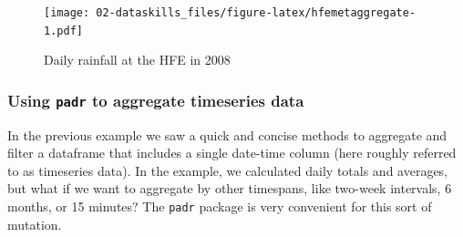 \documentclass[]{book}
\newenvironment{Shaded}{\begin{snugshade}}{\end{snugshade}}
\newcommand{\CommentTok}[1]{\textcolor[rgb]{0.56,0.35,0.01}{\textit{#1}}}
\newcommand{\DataTypeTok}[1]{\textcolor[rgb]{0.13,0.29,0.53}{#1}}
\newcommand{\KeywordTok}[1]{\textcolor[rgb]{0.13,0.29,0.53}{\textbf{#1}}}
\newcommand{\NormalTok}[1]{#1}
\newcommand{\OperatorTok}[1]{\textcolor[rgb]{0.81,0.36,0.00}{\textbf{#1}}}
\newcommand{\StringTok}[1]{\textcolor[rgb]{0.31,0.60,0.02}{#1}}
\begin{document}
\begin{Shaded}
\end{Shaded}

\begin{figure}
\centering
\texttt{[image: 02-dataskills\_files/figure-latex/hfemetaggregate-1.pdf]}
\caption{\label{fig:hfemetaggregate}Daily rainfall at the HFE in 2008}
\end{figure}

\hypertarget{using-padr-to-aggregate-timeseries-data}{%
\subsubsection{\texorpdfstring{Using \texttt{padr} to aggregate timeseries data}{Using padr to aggregate timeseries data}}\label{using-padr-to-aggregate-timeseries-data}}

In the previous example we saw a quick and concise methods to aggregate and filter a dataframe that includes a single date-time column (here roughly referred to as timeseries data). In the example, we calculated daily totals and averages, but what if we want to aggregate by other timespans, like two-week intervals, 6 months, or 15 minutes? The \texttt{padr} package is very convenient for this sort of mutation.
\end{document}
